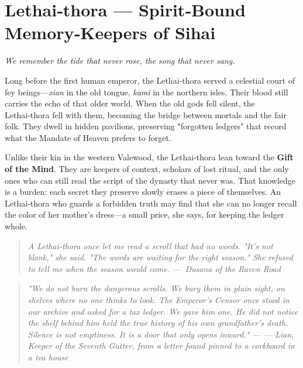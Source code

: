 \documentclass[12pt]{book}
\newcommand{\dusana}[1]{%
    \begin{quote}\itshape #1 ---~Dusana of the Raven Road\end{quote}}
\newcommand{\letter}[2]{%
    \begin{quote}\small\itshape #1 \hfill --- #2\end{quote}}
\begin{document}
\section{Lethai‑thora --- Spirit‑Bound Memory‑Keepers of Sihai}

\noindent \textit{We remember the tide that never rose, the song that never sang.}

Long before the first human emperor, the Lethai‑thora served a celestial court of fey beings---\textit{xian} in the old tongue, \textit{kami} in the northern isles. Their blood still carries the echo of that older world. When the old gods fell silent, the Lethai‑thora fell with them, becoming the bridge between mortals and the fair folk. They dwell in hidden pavilions, preserving "forgotten ledgers" that record what the Mandate of Heaven prefers to forget.

Unlike their kin in the western Valewood, the Lethai‑thora lean toward the \textbf{Gift of the Mind}. They are keepers of context, scholars of lost ritual, and the only ones who can still read the script of the dynasty that never was. That knowledge is a burden: each secret they preserve slowly erases a piece of themselves. An Lethai‑thora who guards a forbidden truth may find that she can no longer recall the color of her mother's dress---a small price, she says, for keeping the ledger whole.

\vspace{0.5em}
\dusana{A Lethai‑thora once let me read a scroll that had no words. "It's not blank," she said. "The words are waiting for the right season." She refused to tell me when the season would come.}

\letter{"We do not burn the dangerous scrolls. We bury them in plain sight, on shelves where no one thinks to look. The Emperor's Censor once stood in our archive and asked for a tax ledger. We gave him one. He did not notice the shelf behind him held the true history of his own grandfather's death. Silence is not emptiness. It is a door that only opens inward."}{--- Lian, Keeper of the Seventh Gutter, from a letter found pinned to a corkboard in a tea house}
\end{document}
